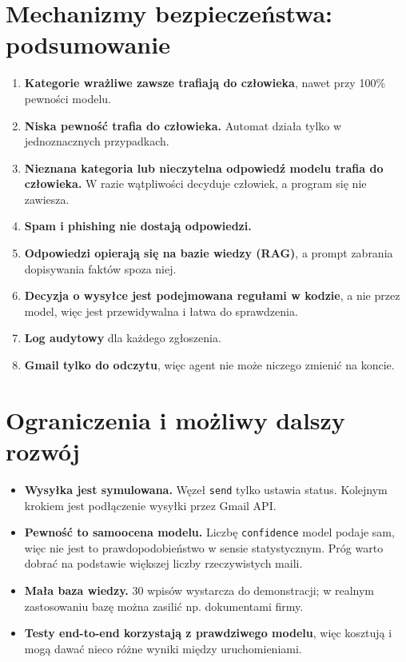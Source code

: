 \documentclass[11pt,a4paper]{article}
\begin{document}
\section{Mechanizmy bezpieczeństwa: podsumowanie}

\begin{enumerate}
  \item \textbf{Kategorie wrażliwe zawsze trafiają do człowieka}, nawet przy
        100\% pewności modelu.
  \item \textbf{Niska pewność trafia do człowieka.} Automat działa tylko
        w jednoznacznych przypadkach.
  \item \textbf{Nieznana kategoria lub nieczytelna odpowiedź modelu trafia
        do człowieka.} W razie wątpliwości decyduje człowiek, a program się
        nie zawiesza.
  \item \textbf{Spam i phishing nie dostają odpowiedzi.}
  \item \textbf{Odpowiedzi opierają się na bazie wiedzy (RAG)}, a prompt
        zabrania dopisywania faktów spoza niej.
  \item \textbf{Decyzja o wysyłce jest podejmowana regułami w kodzie}, a nie
        przez model, więc jest przewidywalna i łatwa do sprawdzenia.
  \item \textbf{Log audytowy} dla każdego zgłoszenia.
  \item \textbf{Gmail tylko do odczytu}, więc agent nie może niczego zmienić
        na koncie.
\end{enumerate}

\section{Ograniczenia i możliwy dalszy rozwój}

\begin{itemize}
  \item \textbf{Wysyłka jest symulowana.} Węzeł \texttt{send} tylko ustawia
        status. Kolejnym krokiem jest podłączenie wysyłki przez Gmail API.
  \item \textbf{Pewność to samoocena modelu.} Liczbę \texttt{confidence}
        model podaje sam, więc nie jest to prawdopodobieństwo w sensie
        statystycznym. Próg warto dobrać na podstawie większej liczby
        rzeczywistych maili.
  \item \textbf{Mała baza wiedzy.} 30 wpisów wystarcza do demonstracji;
        w realnym zastosowaniu bazę można zasilić np. dokumentami firmy.
  \item \textbf{Testy end-to-end korzystają z prawdziwego modelu}, więc
        kosztują i mogą dawać nieco różne wyniki między uruchomieniami.
\end{itemize}
\end{document}
